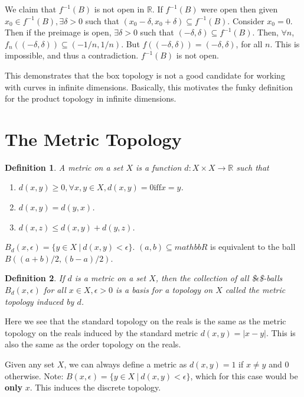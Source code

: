 \documentclass[11pt]{article}
\newtheorem{definition}{Definition}[section]
\begin{document}
We claim that \(f^{-1}(B)\) is not open in \(\mathbb{R}\). If \(f^{-1}(B)\) were open
then given \(x_0 \in f^{-1}(B), \exists \delta > 0\) such that \((x_0 - \delta,
x_0 + \delta)\subseteq f^{-1}(B)\). Consider \(x_0 = 0\). Then if the preimage is
open, \(\exists \delta > 0\) such that \((-\delta, \delta) \subseteq
f^{-1}(B)\). Then, \(\forall n\), \(f_n((-\delta, \delta)) \subseteq (-1/n, 1/n)\).
But \(f((-\delta, \delta)) = (-\delta, \delta)\), for all \(n\). This is impossible,
and thus a contradiction. \(f^{-1}(B)\) is not open. 

This demonstrates that the box topology is not a good candidate for working with
curves in infinite dimensions. Basically, this motivates the funky definition
for the product topology in infinite dimensions. 

\section{The Metric Topology}
\label{sec:org1547bec}
\begin{definition}
A metric on a set \(X\) is a function \(d:X\times X\rightarrow \mathbb{R}\) such
that 

\begin{enumerate}
\item \(d(x,y) \geq 0, \forall x,y \in X, d(x,y) = 0\text{iff} x = y\).
\item \(d(x,y) = d(y,x)\).
\item \(d(x,z) \leq d(x,y) + d(y,z)\).
\end{enumerate}
\end{definition}

\(B_d(x,\epsilon) = \{ y \in X\ |\ d(x,y) < \epsilon\}\). \((a,b) \subseteq
mathbb{R}\) is equivalent to the ball \(B((a+b)/2, (b-a)/2)\). 
\begin{definition}
If \(d\) is a metric on a set \(X\), then the collection of all \$\(\epsilon\)\$-balls
\(B_d(x,\epsilon)\) for all \(x\in X, \epsilon > 0\) is a basis for a topology on
\(X\) called the metric topology induced by \(d\). 
\end{definition}

Here we see that the standard topology on the reals is the same as the metric
topology on the reals induced by the standard metric \(d(x,y) = |x - y|\). This is
also the same as the order topology on the reals.

Given any set \(X\), we can always define a metric as \(d(x,y) = 1\) if \(x \not = y\)
and \(0\) otherwise. Note: \(B(x,\epsilon) = \{ y\in X\ |\ d(x,y) < \epsilon\}\),
which for this case would be \textbf{only} \(x\). This induces the discrete topology.
\end{document}
